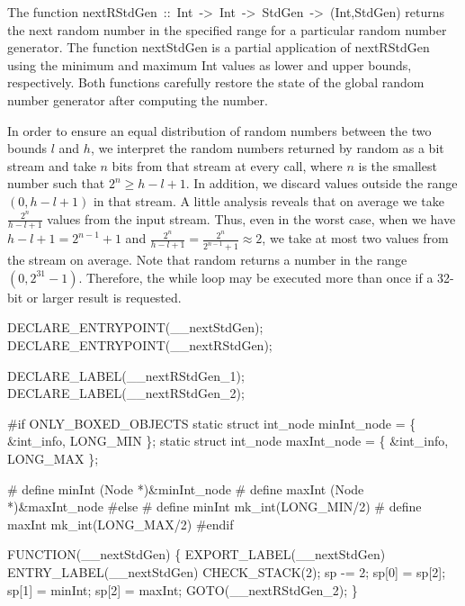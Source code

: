 \nwendcode{}\nwdocspar
The function {\Tt{}nextRStdGen\ ::\ Int\ ->\ Int\ ->\ StdGen\ ->\ (Int,StdGen)\nwendquote}
returns the next random number in the specified range for a particular
random number generator. The function {\Tt{}nextStdGen\nwendquote} is a partial
application of {\Tt{}nextRStdGen\nwendquote} using the minimum and maximum {\Tt{}Int\nwendquote}
values as lower and upper bounds, respectively. Both functions
carefully restore the state of the global random number generator
after computing the number.

In order to ensure an equal distribution of random numbers between the
two bounds $l$ and $h$, we interpret the random numbers returned by
{\Tt{}random\nwendquote} as a bit stream and take $n$ bits from that stream at every
call, where $n$ is the smallest number such that $2^n \geq h-l+1$. In
addition, we discard values outside the range $(0,h-l+1)$ in that
stream. A little analysis reveals that on average we take
$\frac{2^n}{h-l+1}$ values from the input stream. Thus, even in the
worst case, when we have $h-l+1 = 2^{n-1} + 1$ and
$\frac{2^n}{h-l+1} = \frac{2^n}{2^{n-1}+1} \approx 2$, we take at most
two values from the stream on average. Note that {\Tt{}random\nwendquote} returns
a number in the range $(0,2^{31}-1)$. Therefore, the {\Tt{}while\nwendquote} loop
may be executed more than once if a 32-bit or larger result is
requested.

\nwenddocs{}\plusendmoddef\nwstartdeflinemarkup{}\nwenddeflinemarkup
DECLARE_ENTRYPOINT(__nextStdGen);
DECLARE_ENTRYPOINT(__nextRStdGen);

DECLARE_LABEL(__nextRStdGen_1);
DECLARE_LABEL(__nextRStdGen_2);

#if ONLY_BOXED_OBJECTS
static struct int_node minInt_node = \{ &int_info, LONG_MIN \};
static struct int_node maxInt_node = \{ &int_info, LONG_MAX \};

# define minInt (Node *)&minInt_node
# define maxInt (Node *)&maxInt_node
#else
# define minInt mk_int(LONG_MIN/2)
# define maxInt mk_int(LONG_MAX/2)
#endif

FUNCTION(__nextStdGen)
\{
    EXPORT_LABEL(__nextStdGen)
 ENTRY_LABEL(__nextStdGen)
    CHECK_STACK(2);
    sp   -= 2;
    sp[0] = sp[2];
    sp[1] = minInt;
    sp[2] = maxInt;
    GOTO(__nextRStdGen_2);
\}

